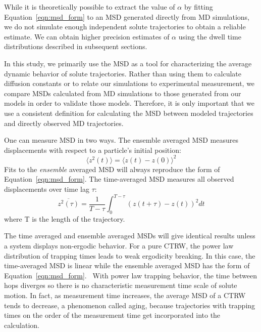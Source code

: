 \documentclass[aps,pre,preprint,groupedaddress,longbibliography]{revtex4-2}
\begin{document}
  While it is theoretically possible to extract the value of $\alpha$ by fitting
  Equation~\ref{eqn:msd_form} to an MSD generated directly from MD simulations, 
  we do not simulate enough independent solute trajectories to obtain a reliable
  estimate. We can obtain higher precision estimates of $\alpha$ using the dwell
  time distributions described in subsequent sections.

  In this study, we primarily use the MSD as a tool for characterizing the average
  dynamic behavior of solute trajectories. Rather than using them to calculate 
  diffusion constants or to relate our simulations to experimental measurement, we
  compare MSDs calculated from MD simulations to those generated from our models 
  in order to validate those models. Therefore, it is only important that we use a
  consistent definition for calculating the MSD between modeled trajectories and
  directly observed MD trajectories.

  One can measure MSD in two ways. The ensemble averaged MSD measures 
  displacements with respect to a particle's initial position:
  \begin{equation}
  \langle z^2(t) \rangle = \langle z(t) - z(0) \rangle^2
  \label{eqn:ensemble_msd}
  \end{equation}
  Fits to the \textit{ensemble} averaged MSD will always reproduce the form of 
  Equation~\ref{eqn:msd_form}. The time-averaged MSD measures all observed 
  displacements over time lag $\tau$: 
  \begin{equation}
  \overline{z^2(\tau)} = \dfrac{1}{T - \tau}\int_{0}^{T - \tau} (z(t + \tau) - z(t))^2 dt
  \label{eqn:tamsd}
  \end{equation}
  where T is the length of the trajectory. 
  
  The time averaged and ensemble averaged MSDs will give identical results 
  unless a system displays non-ergodic behavior. For a pure CTRW, the power 
  law distribution of trapping times leads to weak ergodicity breaking.
  In this case, the time-averaged MSD is linear while the ensemble averaged
  MSD has the form of Equation~\ref{eqn:msd_form}.~\cite{meroz_toolbox_2015} With
  power law trapping behavior, the time between hops diverges so there is no 
  characteristic measurement time scale of solute motion. In fact, as measurement 
  time increases, the average MSD of a CTRW tends to decrease, a phenomenon called
  aging, because trajectories with trapping times on the order of the measurement 
  time get incorporated into the calculation.~\cite{bel_weak_2005}
  
\end{document}
